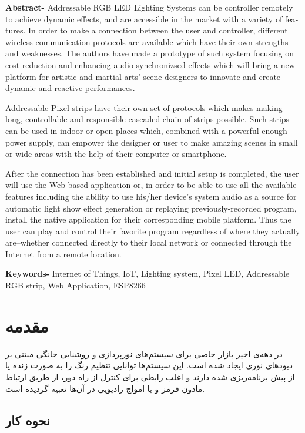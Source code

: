 \documentclass[12pt,twocolumn,a4paper,oneside]{article}
\begin{document}
\begin{latin}
{\bfseries Abstract-}
Addressable RGB LED Lighting Systems can be controller remotely to achieve dynamic effects, and are accessible in the market with a variety of features. In order to make a connection between the user and controller, different wireless communication protocols are available which have their own strengths and weaknesses. The authors have made a prototype of such system focusing on cost reduction and enhancing audio-synchronizsed effects which will bring a new platform for artistic and martial arts' scene designers to innovate and create dynamic and reactive performances.

Addressable Pixel strips have their own set of protocols which makes making long, controllable and responsible cascaded chain of strips possible. Such strips can be used in indoor or open places which, combined with a powerful enough power supply, can empower the designer or user to make amazing scenes in small or wide areas with the help of their computer or smartphone.

After the connection has been established and initial setup is completed, the user will use the Web-based application or, in order to be able to use all the available features including the ability to use his/her device's system audio as a source for automatic light show effect generation or replaying previously-recorded program, install the native application for their corresponding mobile platform. Thus the user can play and control their favorite program regardless of where they actually are--whether connected directly to their local network or connected through the Internet from a remote location.

{\bfseries Keywords-} Internet of Things, IoT, Lighting system, Pixel LED, Addressable RGB strip, Web Application, ESP8266
\end{latin}

\section{مقدمه}
در دهه‌ی اخیر بازار خاصی برای سیستم‌های نورپردازی و روشنایی خانگی مبتنی بر دیودهای نوری ایجاد شده است. این سیستم‌ها توانایی تنظیم رنگ را به صورت زنده یا از پیش برنامه‌ریزی شده دارند و اغلب رابطی برای کنترل از راه دور، از طریق ارتباط مادون قرمز و یا امواج رادیویی در آن‌ها تعبیه گردیده است.

\subsection{نحوه کار}
\end{document}
